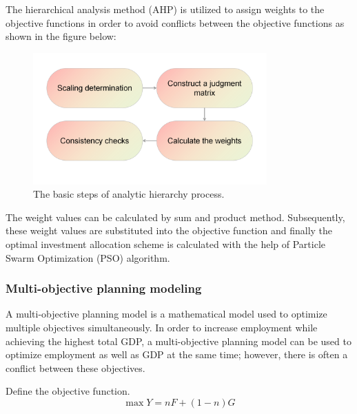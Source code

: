 \documentclass[12pt]{article}  %
\begin{document}
	The hierarchical analysis method (AHP) is utilized to assign weights to the objective functions in order to avoid conflicts between the objective functions as shown in the figure below:
	
	\begin{figure}[H] %
		\centering
		\includegraphics[width=0.8\textwidth]{img/AHP} %
		\caption{The basic steps of analytic hierarchy process.} %
		\label{AHP} %
	\end{figure}
	
	
	The weight values can be calculated by sum and product method. Subsequently, these weight values are substituted into the objective function and finally the optimal investment allocation scheme is calculated with the help of Particle Swarm Optimization (PSO) algorithm.
	
	\subsubsection{Multi-objective planning modeling}
	
	A multi-objective planning model is a mathematical model used to optimize multiple objectives simultaneously. In order to increase employment while achieving the highest total GDP, a multi-objective planning model can be used to optimize employment as well as GDP at the same time; however, there is often a conflict between these objectives.
	
	Define the objective function.
		\begin{equation}
			\max Y = nF + \left( {1 - n} \right)G
		\end{equation}
	
\end{document}

